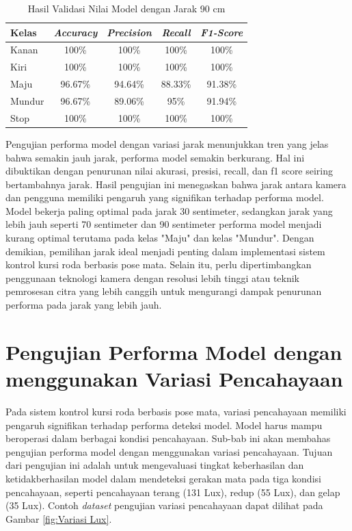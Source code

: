\begin{longtable}{|l|c|c|c|c|}
  \caption{Hasil Validasi Nilai Model dengan Jarak 90 cm}
  \label{tb:vs_model6} \\
  \hline
  \rowcolor[HTML]{C0C0C0} 
  \textbf{Kelas} & \textbf{\emph{Accuracy}} & \textbf{\emph{Precision}} & \textbf{\emph{Recall}} & \textbf{\emph{F1-Score}} \\ \hline
  Kanan    & 100\%            & 100\%             & 100\%           & 100\%            \\ \hline
  Kiri     & 100\%          & 100\%           & 100\%           & 100\%           \\ \hline
  Maju      & 96.67\%          & 94.64\%           & 88.33\%          & 91.38\%          \\ \hline
  Mundur     & 96.67\%            & 89.06\%             & 95\%           & 91.94\%            \\ \hline
  Stop  & 100\%            & 100\%             & 100\%           & 100\%            \\ \hline
\end{longtable}

Pengujian performa model dengan variasi jarak menunjukkan tren yang jelas bahwa semakin jauh jarak, performa model semakin berkurang. Hal ini dibuktikan dengan penurunan nilai akurasi, presisi, recall, dan f1 score seiring bertambahnya jarak. Hasil pengujian ini menegaskan bahwa jarak antara kamera dan pengguna memiliki pengaruh yang signifikan terhadap performa model. Model bekerja paling optimal pada jarak 30 sentimeter, sedangkan jarak yang lebih jauh seperti 70 sentimeter dan 90 sentimeter performa model menjadi kurang optimal terutama pada kelas "Maju" dan kelas "Mundur". Dengan demikian, pemilihan jarak ideal menjadi penting dalam implementasi sistem kontrol kursi roda berbasis pose mata. Selain itu, perlu dipertimbangkan penggunaan teknologi kamera dengan resolusi lebih tinggi atau teknik pemrosesan citra yang lebih canggih untuk mengurangi dampak penurunan performa pada jarak yang lebih jauh. 

\section{Pengujian Performa Model dengan menggunakan Variasi Pencahayaan}

Pada sistem kontrol kursi roda berbasis pose mata, variasi pencahayaan memiliki pengaruh signifikan terhadap performa deteksi model. Model harus mampu beroperasi dalam berbagai kondisi pencahayaan. Sub-bab ini akan membahas pengujian performa model dengan menggunakan variasi pencahayaan. Tujuan dari pengujian ini adalah untuk mengevaluasi tingkat keberhasilan dan ketidakberhasilan model dalam mendeteksi gerakan mata pada tiga kondisi pencahayaan, seperti pencahayaan terang (131 Lux), redup (55 Lux), dan gelap (35 Lux). Contoh \emph{dataset} pengujian variasi pencahayaan dapat dilihat pada Gambar \ref{fig:Variasi Lux}.

